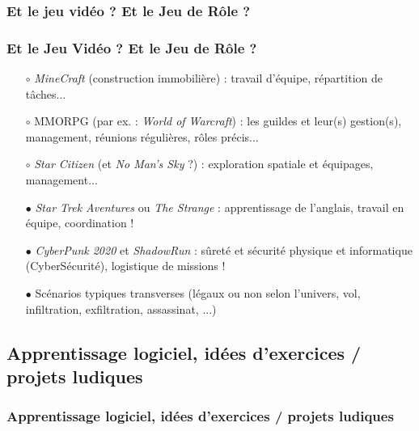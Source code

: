 \documentclass[slidetop,11pt]{beamer}
\begin{document}
\subsubsection{Et le jeu vid{\'e}o ? Et le Jeu de R{\^o}le ?}
\begin{frame}
	\frametitle{Et le Jeu Vid{\'e}o ? Et le Jeu de R{\^o}le ?}
	\begin{itemize}
		\item[$\circ$] \emph{MineCraft} (construction immobili{\`e}re) : travail d'{\'e}quipe, r{\'e}partition de t{\^a}ches... 
		\item[$\circ$] MMORPG (par ex. : \emph{World of Warcraft})  : les guildes et leur(s) gestion(s), management, r{\'e}unions r{\'e}guli{\`e}res, r{\^o}les pr{\'e}cis... 
		\item[$\circ$] \emph{Star Citizen} (et \emph{No Man's Sky} ?) : exploration spatiale et {\'e}quipages, management... 
		\item[] 
		\item[$\bullet$] \emph{Star Trek Aventures} ou \emph{The Strange} : apprentissage de l'anglais, travail en {\'e}quipe, coordination !
		\item[$\bullet$] \emph{CyberPunk 2020} et \emph{ShadowRun} : s{\^u}ret{\'e} et s{\'e}curit{\'e} physique et informatique (CyberS{\'e}curit{\'e}), logistique de missions !
		\item[$\bullet$] Sc{\'e}narios typiques transverses (l{\'e}gaux ou non selon l'univers, vol, infiltration, exfiltration, assassinat, ...)
	\end{itemize}
\end{frame} 

\subsection{Apprentissage logiciel, id{\'e}es d'exercices / projets ludiques}
\begin{frame}
	\frametitle{Apprentissage logiciel, id{\'e}es d'exercices / projets ludiques}
	\tableofcontents[sections=4,currentsection,subsectionstyle=show/shaded/hide]
\end{frame} 
\end{document}
